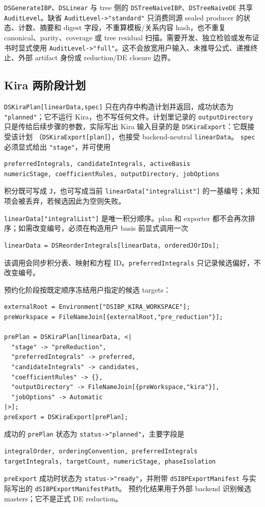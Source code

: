 ﻿\documentclass[a4paper,11pt]{article}
\begin{document}
\texttt{DSGenerateIBP}、\allowbreak\texttt{DSLinear} 与 tree 侧的
\texttt{DSTreeNaiveIBP}、\allowbreak\texttt{DSTreeNaiveDE} 共享
\texttt{AuditLevel}。缺省 \texttt{AuditLevel->"standard"} 只消费同源 sealed producer 的状态、计数、摘要和 digest 字段，不重算模板/关系内容 hash，也不重复 canonical、parity、coverage 或 tree residual 扫描。需要开发、独立检验或发布证书时显式使用 \texttt{AuditLevel->"full"}。这不会放宽用户输入、未推导公式、递推终止、外部 artifact 身份或 reduction/DE closure 边界。

\subsection{Kira 两阶段计划}

\texttt{DSKiraPlan[linearData,spec]} 只在内存中构造计划并返回，成功状态为
\texttt{"planned"}；它不运行 Kira，也不写任何文件。计划里记录的 \texttt{outputDirectory}
只是传给后续步骤的参数，实际写出 Kira 输入目录的是 \texttt{DSKiraExport}：它既接受该计划
（\texttt{DSKiraExport[plan]}），也接受 backend-neutral \texttt{linearData}。
\texttt{spec} 必须显式给出 \texttt{"stage"}，并可使用
\begin{verbatim}
preferredIntegrals, candidateIntegrals, activeBasis
numericStage, coefficientRules, outputDirectory, jobOptions
\end{verbatim}
积分既可写成 \texttt{J}，也可写成当前
\texttt{linearData["integralList"]} 的一基编号；未知项会被丢弃，若候选因此为空则失败。

\texttt{linearData["integralList"]} 是唯一积分顺序。plan 和 exporter 都不会再次排序；如需改变编号，必须在构造用户 basis 前显式调用一次
\begin{verbatim}
linearData = DSReorderIntegrals[linearData, orderedJOrIDs];
\end{verbatim}
该调用会同步积分表、映射和方程 ID。\texttt{preferredIntegrals} 只记录候选偏好，不改变编号。

预约化阶段按既定顺序冻结用户指定的候选 targets：
\begin{verbatim}
externalRoot = Environment["DSIBP_KIRA_WORKSPACE"];
preWorkspace = FileNameJoin[{externalRoot,"pre_reduction"}];

prePlan = DSKiraPlan[linearData, <|
  "stage" -> "preReduction",
  "preferredIntegrals" -> preferred,
  "candidateIntegrals" -> candidates,
  "coefficientRules" -> {},
  "outputDirectory" -> FileNameJoin[{preWorkspace,"kira"}],
  "jobOptions" -> Automatic
|>];
preExport = DSKiraExport[prePlan];
\end{verbatim}
成功的 \texttt{prePlan} 状态为 \texttt{status->"planned"}，主要字段是
\begin{verbatim}
integralOrder, orderingConvention, preferredIntegrals
targetIntegrals, targetCount, numericStage, phaseIsolation
\end{verbatim}
\texttt{preExport} 成功时状态为 \texttt{status->"ready"}，并附带
\texttt{dSIBPExportManifest} 与实际写出的 \texttt{dSIBPExportManifestPath}。
预约化结果用于外部 backend 识别候选 masters；它不是正式 DE reduction。
\end{document}
